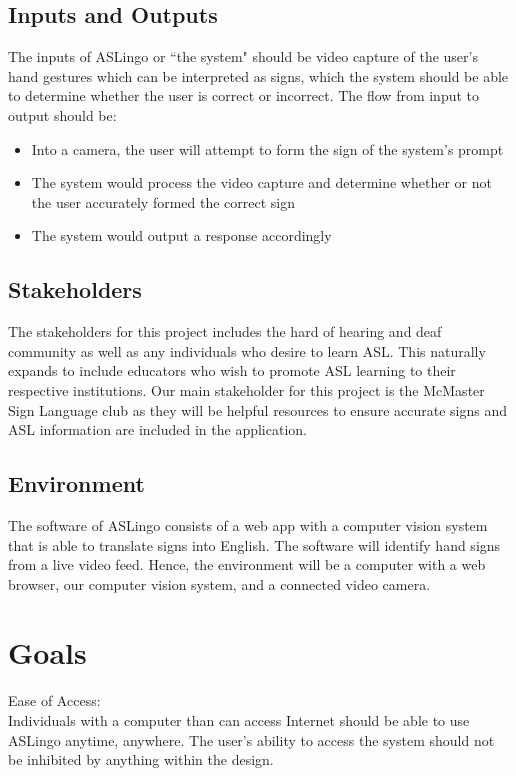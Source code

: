 \documentclass{article}
\begin{document}
\subsection{Inputs and Outputs}

The inputs of ASLingo or ``the system" should be video capture of the user's hand gestures which can be interpreted as signs, which the system should be able to determine whether the user is correct or incorrect. The flow from input to output should be:

\begin{itemize}
    \item Into a camera, the user will attempt to form the sign of the system's prompt
    \item The system would process the video capture and determine whether or not the user accurately formed the correct sign
    \item The system would output a response accordingly
\end{itemize}

\subsection{Stakeholders}

The stakeholders for this project includes the hard of hearing and deaf community as well as any individuals who desire to learn ASL. This naturally expands to include educators who wish to promote ASL learning to their respective institutions. Our main stakeholder for this project is the McMaster Sign Language club as they will be helpful resources to ensure accurate signs and ASL information are included in the application. 

\subsection{Environment}

The software of ASLingo consists of a web app with a computer vision system that is able to translate signs into English. The software will identify hand signs from a live video feed. Hence, the environment will be a computer with a web browser, our computer vision system, and a connected video camera.

\section{Goals}

Ease of Access:\\
Individuals with a computer than can access Internet should be able to use ASLingo anytime, anywhere. The user's ability to access the system should not be inhibited by anything within the design.
\end{document}
